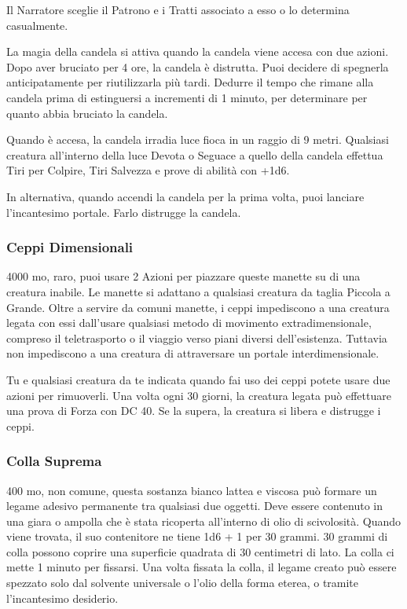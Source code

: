 \begin{multicols}{2}
	Il Narratore sceglie il Patrono e i Tratti associato a esso o lo determina casualmente.

	La magia della candela si attiva quando la candela viene accesa con due azioni. Dopo aver bruciato per 4 ore, la candela è distrutta. Puoi decidere di spegnerla anticipatamente per riutilizzarla più tardi. Dedurre il tempo che rimane alla candela prima di estinguersi a incrementi di 1 minuto, per determinare per quanto abbia bruciato la candela.

	Quando è accesa, la candela irradia luce fioca in un raggio di 9 metri. Qualsiasi creatura all'interno della luce Devota o Seguace a quello della candela effettua Tiri per Colpire, Tiri Salvezza e prove di abilità con +1d6.

	In alternativa, quando accendi la candela per la prima volta, puoi lanciare l'incantesimo portale. Farlo distrugge la candela.

	\subsubsection*{Ceppi Dimensionali}
	4000 mo, raro, puoi usare 2 Azioni per piazzare queste manette su di una creatura inabile. Le manette si adattano a qualsiasi creatura da taglia Piccola a Grande. Oltre a servire da comuni manette, i ceppi impediscono a una creatura legata con essi dall'usare qualsiasi metodo di movimento extradimensionale, compreso il teletrasporto o il viaggio verso piani diversi dell'esistenza. Tuttavia non impediscono a una creatura di attraversare un portale interdimensionale.

	Tu e qualsiasi creatura da te indicata quando fai uso dei ceppi potete usare due azioni per rimuoverli. Una volta ogni 30 giorni, la creatura legata può effettuare una prova di Forza con DC 40. Se la supera, la creatura si libera e distrugge i ceppi.

	\subsubsection*{Colla Suprema}
	400 mo, non comune, questa sostanza bianco lattea e viscosa può formare un legame adesivo permanente tra qualsiasi due oggetti. Deve essere contenuto in una giara o ampolla che è stata ricoperta all'interno di olio di scivolosità. Quando viene trovata, il suo contenitore ne tiene 1d6 + 1 per 30 grammi. 30 grammi di colla possono coprire una superficie quadrata di 30 centimetri di lato. La colla ci mette 1 minuto per fissarsi. Una volta fissata la colla, il legame creato può essere spezzato solo dal solvente universale o l'olio della forma eterea, o tramite l'incantesimo desiderio.


\end{multicols}
